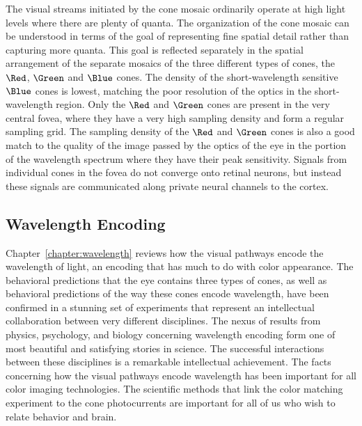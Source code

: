 The visual streams initiated by
the cone mosaic ordinarily operate at high light levels
where there are plenty of quanta.
The organization of the cone mosaic
can be understood 
in terms of the goal of representing
fine spatial detail rather than capturing more quanta.
This goal is reflected separately in the spatial arrangement
of the separate mosaics of the three different types of cones,
the $\Red$, $\Green$ and $\Blue$ cones.
The density of the short-wavelength sensitive $\Blue$ cones
is lowest, matching the poor resolution of the optics
in the short-wavelength region.
Only the $\Red$ and $\Green$ cones 
are present in the very central fovea,
where they have a very high
sampling density and form a regular sampling grid.
The sampling density of the $\Red$ and
$\Green$ cones is also a good match to the quality of the
image passed by the optics of the eye in the portion
of the wavelength spectrum where they have their peak sensitivity.
Signals from individual cones in the fovea do not converge
onto retinal neurons, but instead these signals are communicated
along private neural channels to the cortex.

\subsection*{Wavelength Encoding}
Chapter~\ref{chapter:wavelength} reviews
how the visual pathways encode the wavelength of light,
an encoding that has much to do with color appearance.
The behavioral predictions that the eye contains
three types of cones,
as well as behavioral predictions of the way
these cones encode wavelength,
have been confirmed in a stunning set of experiments
that represent an intellectual collaboration between
very different disciplines.
The nexus of results from physics,
psychology, and biology concerning wavelength encoding
form one of most beautiful and satisfying stories in science.
The successful interactions between these disciplines
is a remarkable intellectual achievement.
The facts concerning how the visual pathways encode wavelength
has been important for all color imaging technologies.
The scientific methods that link the
color matching experiment to the cone photocurrents
are important for all of us who wish
to relate behavior and brain.

